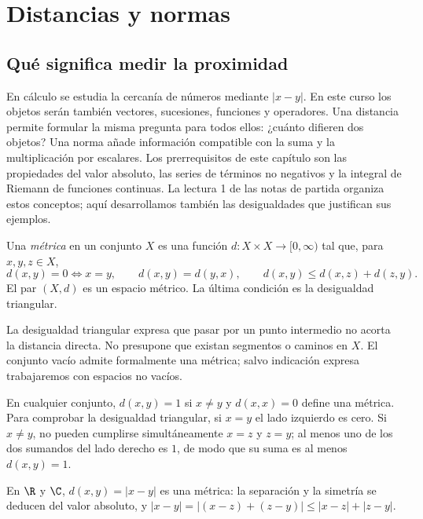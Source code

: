 \chapter{Distancias y normas}\label{chap:01}
\section{Qué significa medir la proximidad}
En cálculo se estudia la cercanía de números mediante $|x-y|$. En este curso los objetos serán también vectores, sucesiones, funciones y operadores. Una distancia permite formular la misma pregunta para todos ellos: ¿cuánto difieren dos objetos? Una norma añade información compatible con la suma y la multiplicación por escalares. Los prerrequisitos de este capítulo son las propiedades del valor absoluto, las series de términos no negativos y la integral de Riemann de funciones continuas. La lectura 1 de las notas de partida \cite{valencia} organiza estos conceptos; aquí desarrollamos también las desigualdades que justifican sus ejemplos.

\begin{definicion}\label{ch01:metrica}
Una \emph{métrica} en un conjunto $X$ es una función $d:X\times X\to[0,\infty)$ tal que, para $x,y,z\in X$,
\[
d(x,y)=0\Longleftrightarrow x=y,\qquad d(x,y)=d(y,x),\qquad
d(x,y)\le d(x,z)+d(z,y).
\]
El par $(X,d)$ es un espacio métrico. La última condición es la desigualdad triangular.
\end{definicion}
La desigualdad triangular expresa que pasar por un punto intermedio no acorta la distancia directa. No presupone que existan segmentos o caminos en $X$. El conjunto vacío admite formalmente una métrica; salvo indicación expresa trabajaremos con espacios no vacíos.

\begin{ejemplo}
En cualquier conjunto, $d(x,y)=1$ si $x\ne y$ y $d(x,x)=0$ define una métrica. Para comprobar la desigualdad triangular, si $x=y$ el lado izquierdo es cero. Si $x\ne y$, no pueden cumplirse simultáneamente $x=z$ y $z=y$; al menos uno de los dos sumandos del lado derecho es $1$, de modo que su suma es al menos $d(x,y)=1$.
\end{ejemplo}
En $\R$ y $\C$, $d(x,y)=|x-y|$ es una métrica: la separación y la simetría se deducen del valor absoluto, y $|x-y|=|(x-z)+(z-y)|\le|x-z|+|z-y|$.

